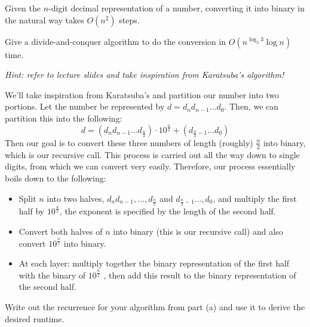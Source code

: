 \documentclass[11pt]{article}
\begin{document}
\pagebreak
{}

Given the $n$-digit decimal representation of a number, converting it into binary in the natural way takes $O(n^2)$ steps. %



\begin{subparts}

\subpart Give a divide-and-conquer algorithm to do the conversion in $O(n^{\log_2 3} \log n)$ time. 

\emph{Hint: refer to lecture slides and take inspiration from Karatsuba's algorithm!}

\begin{solution}
	We'll take inspiration from Karatsuba's and partition our number into two portions. Let the 
	number be represented by $d = d_n d_{n-1} \dots d_0$. Then, we can partition this into the following:
	\[
		d = (d_n d_{n-1} \dots d_{\frac{n}{2}}) \cdot 10^{\frac{n}{2}} + (d_{\frac{n}{2}-1} \dots d_0)
	\] 
	Then our goal is to convert these three numbers of length (roughly) $\frac{n}{2}$ into binary, which 
	is our recursive call. This process is carried out all the way down to single digits, from which we 
	can convert very easily. Therefore, our process essentially boils down to the following:
	\begin{itemize}
		\item Split $n$ into two halves, $d_n d_{n-1}, \dots, d_{\frac{n}{2}}$ and $d_{\frac{n}{2}-1}\dots, d_0$,
			and multiply the first half by $10^{\frac{n}{2}}$, the exponent is specified by the length of 
			the second half.
		\item Convert both halves of $n$ into binary (this is our recursive call) and also convert $10^{\frac{n}{2}}$ 
			into binary.
		\item At each layer: multiply together the binary representation of the first half with the binary of
			$10^{\frac{n}{2}}$
			, then add this result to the binary representation of the second half.

	\end{itemize}
\end{solution}

\subpart Write out the recurrence for your algorithm from part (a) and use it to derive the desired runtime. 


\end{subparts}
\end{document}
